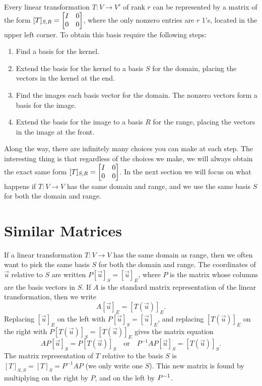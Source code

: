 Every linear transformation $T\colon V\to V'$ of rank $r$ can be represented by a matrix of the form $[T]_{S,R}=\begin{bmatrix} I&0\\0&0 \end{bmatrix}$, where the only nonzero entries are $r$ 1's, located in the upper left corner. To obtain this basis require the following steps: 
\begin{enumerate}
	\item Find a basis for the kernel.
	\item Extend the basis for the kernel to a basis $S$ for the domain, placing the vectors in the kernel at the end.
	\item Find the images each basis vector for the domain. The nonzero vectors form a basis for the image.
	\item Extend the basis for the image to a basis $R$ for the range, placing the vectors in the image at the front.  
\end{enumerate}
Along the way, there are infinitely many choices you can make at each step.  The interesting thing is that regardless of the choices we make, we will always obtain the exact same form $[T]_{S,R}=\begin{bmatrix} I&0\\0&0 \end{bmatrix}$. In the next section we will focus on what happens if $T\colon V\to V$ has the same domain and range, and we use the same basis $S$ for both the domain and range. 




\section{Similar Matrices}
If a linear transformation $T\colon V\to V$ has the same domain as range, then we often want to pick the same basis $S$ for both the domain and range. 
The coordinates of $\vec u$ relative to $S$ are written $P[\vec u]_S = [\vec u]_E$, where $P$ is the matrix whose columns are the basis vectors in $S$. 
If $A$ is the standard matrix representation of the linear transformation, then we write 
$$A[\vec u]_E = [T(\vec u)]_E.$$  
Replacing $[\vec u]_E$ on the left with $P[\vec u]_S = [\vec u]_E$, and replacing $[T(\vec u)]_E$ on the right with $P[T(\vec u)]_S = [T(\vec u)]_E$ gives the matrix equation 
$$AP[\vec u]_S = P[T(\vec u)]_S\quad \text{or}\quad P^{-1}AP [\vec u]_S = [T(\vec u)]_S.$$ The matrix representation of $T$ relative to the basis $S$ is $[T]_{S,S}=[T]_S = P^{-1}AP$ (we only write one $S$). 
This new matrix is found by multiplying on the right by $P$, and on the left by $P^{-1}$.    

